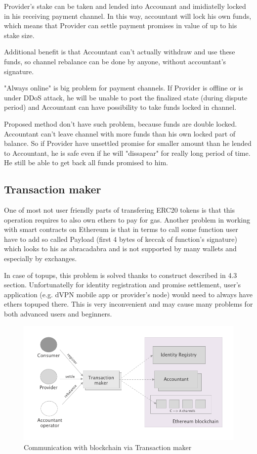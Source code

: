 \documentclass[a4paper,12pt]{article}
\begin{document}
Provider's stake can be taken and lended into Accounant and imidiatelly locked 
in his receiving payment channel. In this way, accountant will lock his own 
funds, which means that Provider can settle payment promises in value of up to 
his stake size.

Additional benefit is that Accountant can't actually withdraw and use these 
funds, so channel rebalance can be done by anyone, without accountant's 
signature.

"Always online" is big problem for payment channels. If Provider is offline or 
is under DDoS attack, he will be unable to post the finalized state (during 
dispute period) and Accountant can have possibility to take funds locked in 
channel.

Proposed method don't have such problem, because funds are double locked. 
Accountant can't leave channel with more funds than his own locked part of 
balance. So if Provider have unsettled promise for smaller amount than he 
lended to Accountant, he is safe even if he will "dissapear" for really long 
period of time. He still be able to get back all funds promised to him.

\subsection{Transaction maker}

One of most not user friendly parts of transfering ERC20 tokens is that this
operation requires to also own ethers to pay for gas. Another problem in
working with smart contracts on Ethereum is that in terms to call some function
user have to add so called Payload (first 4 bytes of keccak of function's
signature) which looks to his as abracadabra and is not supported by many 
wallets and especially by exchanges. 

In case of topups, this problem is solved thanks to construct described in 4.3
section. Unfortunatelly for identity registration and promise settlement, user's 
application (e.g. dVPN mobile app or provider's node) would need to always have 
ethers topuped there. This is very inconvenient and may cause many problems for
both advanced users and beginners.

\begin{figure}[H]
    \centering
    \includegraphics[scale=0.5]{img/transactor}
    \caption{Communication with blockchain via Transaction maker}
    \label{img:transactor}
\end{figure}
\end{document}
